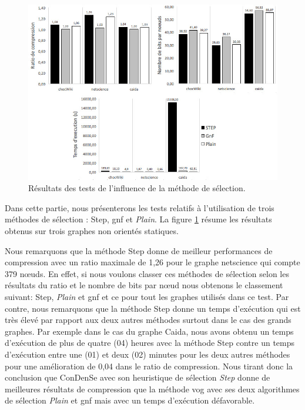 		\begin{figure}[H]
	
			
			\includegraphics[scale=0.7]{ressources/image/vogcond.jpg}
			
			\caption{Résultats des tests de l'influence de la méthode de sélection.}
			\label{fig:test-vogcond}
	
		\end{figure}
		
		Dans cette partie, nous présenterons les tests relatifs à l'utilisation de trois méthodes de sélection : Step, \gls{gnf} et \textit{Plain}. La figure \ref{fig:test-vogcond} résume les résultats obtenus sur  trois graphes non orientés statiques.
		
		Nous remarquons que la méthode Step donne de meilleur performances de compression avec un ratio maximale de 1,26 pour le graphe netscience qui compte 379 nœuds. En effet, si nous voulons classer ces méthodes de sélection selon les résultats du ratio et le nombre de bits par nœud nous obtenons le classement suivant: Step, \textit{Plain} et \gls{gnf} et ce pour tout les graphes utilisés dans ce test. Par contre, nous remarquons que la méthode Step donne un temps d'exécution qui est très élevé par rapport aux deux autres méthodes surtout dans le cas des grands graphes. Par exemple dans le cas du graphe Caida, nous avons obtenu un temps d'exécution de plus de quatre (04) heures avec la méthode Step  contre un temps d'exécution entre une (01) et deux (02) minutes pour les deux autres méthodes pour une amélioration de 0,04 dans le ratio de compression. Nous tirant donc la conclusion que \gls{ConDenSe} avec son heuristique de sélection \textit{Step} donne de meilleures résultats de compression que la méthode \gls{vog} avec ses deux algorithmes de sélection \textit{Plain} et \gls{gnf} mais avec un temps d'exécution défavorable.
		
